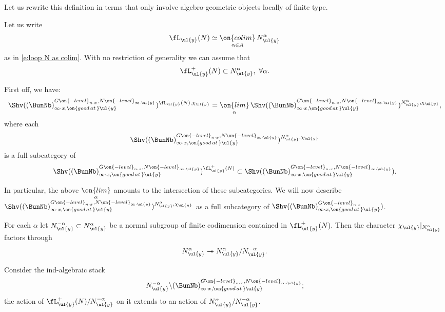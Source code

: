 \documentclass[9pt]{amsart}
\theoremstyle{definition}
\theoremstyle{remark}
\numberwithin{equation}{section}
\begin{document}
Let us rewrite this definition in terms that only involve algebro-geometric objects locally of finite type. 

\sssec{}

Let us write 
$$\fL_{\ul{y}}(N)\simeq \underset{\alpha\in A}{\on{colim}}\, N^\alpha_{\ul{y}}$$
as in \eqref{e:loop N as colim}.  With no restriction of generality we can assume that
$$\fL^+_{\ul{y}}(N) \subset  N^\alpha_{\ul{y}},\,\,\forall \alpha.$$

\medskip

First off, we have:
$$\Shv((\BunNb)^{G\on{-level}_{n\cdot x},N\on{-level}_{\infty\cdot \ul{y}}}_{\infty\cdot x,\on{good\,at\,}\ul{y}})^{\fL_{\ul{y}}(N),\chi_{\ul{y}}}=
\underset{\alpha}{\on{lim}}\,
\Shv((\BunNb)^{G\on{-level}_{n\cdot x},N\on{-level}_{\infty\cdot \ul{y}}}_{\infty\cdot x,\on{good\,at\,}\ul{y}})^{N^\alpha_{\ul{y}},\chi_{\ul{y}}},$$
where each 
$$\Shv((\BunNb)^{G\on{-level}_{n\cdot x},N\on{-level}_{\infty\cdot \ul{y}}}_{\infty\cdot x,\on{good\,at\,}\ul{y}})^{N^\alpha_{\ul{y}},\chi_{\ul{y}}}$$
is a full subcategory of 
$$\Shv((\BunNb)^{G\on{-level}_{n\cdot x},N\on{-level}_{\infty\cdot \ul{y}}}_{\infty\cdot x,\on{good\,at\,}\ul{y}})^{\fL^+_{\ul{y}}(N)}
\subset \Shv((\BunNb)^{G\on{-level}_{n\cdot x},N\on{-level}_{\infty\cdot \ul{y}}}_{\infty\cdot x,\on{good\,at\,}\ul{y}}).$$

In particular, the above $\underset{\alpha}{\on{lim}}$ amounts to the intersection of these subcategories. We will now describe
$\Shv((\BunNb)^{G\on{-level}_{n\cdot x},N\on{-level}_{\infty\cdot \ul{y}}}_{\infty\cdot x,\on{good\,at\,}\ul{y}})^{N^\alpha_{\ul{y}},\chi_{\ul{y}}}$
as a full subcategory of $\Shv((\BunNb)_{\infty\cdot x,\on{good\,at\,}\ul{y}}^{G\on{-level}_{n\cdot x}})$. 

\sssec{}

For each $\alpha$ let $N^{-\alpha}_{\ul{y}}\subset N^\alpha_{\ul{y}}$ be a normal subgroup of finite codimension contained in 
$\fL^+_{\ul{y}}(N)$. Then the character $\chi_{\ul{y}}|_{N^\alpha_{\ul{y}}}$ factors through
$$N^\alpha_{\ul{y}}\twoheadrightarrow N^\alpha_{\ul{y}}/N^{-\alpha}_{\ul{y}}.$$

\medskip

Consider the ind-algebraic stack
$$N^{-\alpha}_{\ul{y}}\backslash (\BunNb)^{G\on{-level}_{n\cdot x},N\on{-level}_{\infty\cdot \ul{y}}}_{\infty\cdot x,\on{good\,at\,}\ul{y}};$$
the action of $\fL^+_{\ul{y}}(N)/N^{-\alpha}_{\ul{y}}$ on it extends to an action of $N^\alpha_{\ul{y}}/N^{-\alpha}_{\ul{y}}$.

\medskip
\end{document}
